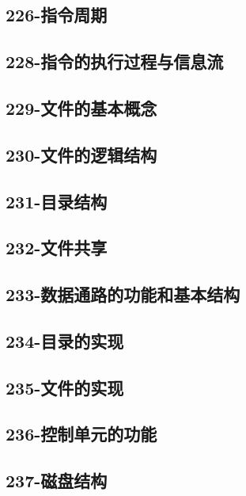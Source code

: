 \subsection{226-指令周期}

\subsection{228-指令的执行过程与信息流}

\subsection{229-文件的基本概念}

\subsection{230-文件的逻辑结构}

\subsection{231-目录结构}

\subsection{232-文件共享}

\subsection{233-数据通路的功能和基本结构}

\subsection{234-目录的实现}

\subsection{235-文件的实现}

\subsection{236-控制单元的功能}

\subsection{237-磁盘结构}

